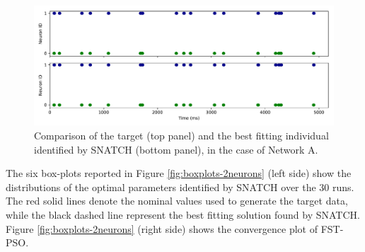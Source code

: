 \documentclass[utf8]{frontiersFPHY} %
\newcommand {\name}{SNATCH}
\begin{document}
\begin{figure}[!ht]
	\centering
	\includegraphics[width=\textwidth]{images/2-neurons-irregular/target_sim.pdf}
	\caption{Comparison of the target (top panel) and the best fitting individual identified by \name{} (bottom panel), in the case of Network A.}
	\label{fig:target-2neurons}
\end{figure}


The six box-plots reported in Figure \ref{fig:boxplots-2neurons} (left side) show the distributions of the optimal parameters identified by \name{} over the $30$ runs.
The red solid lines denote the nominal values used to generate the target data, while the black dashed line represent the best fitting solution found by \name{}. 
Figure \ref{fig:boxplots-2neurons} (right side) shows the convergence plot of FST-PSO.
\end{document}

